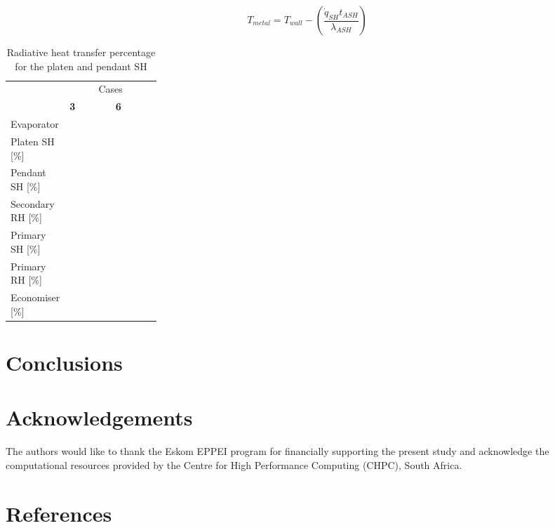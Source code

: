 \documentclass[review]{elsarticle}
\begin{document}
\begin{equation}
T_{metal} = T_{wall} - \left(\frac{\dot{q}_{SH}t_{ASH}}{\lambda_{ASH}}\right)
\end{equation}

\begin{table}[h!]
\centering
\caption{Radiative heat transfer percentage for the platen and pendant SH}
\label{fuel}
{\tabulinesep=1.2mm
\begin{tabularx}{\linewidth}{p{0.25\linewidth} XX}
\hline
&\multicolumn{2}{c}{Cases}\\
 &\textbf{3}&\textbf{6}\\
\hline
Evaporator \\
Platen SH [\%] & \\
Pendant SH [\%] &\\
Secondary RH [\%]\\
Primary SH [\%]\\
Primary RH [\%]\\
Economiser [\%]\\
\hline
\end{tabularx}}
\end{table}

\clearpage
\section{Conclusions}

\section*{Acknowledgements}
The authors would like to thank the Eskom EPPEI program for financially supporting the present study and acknowledge the computational resources provided by the Centre for High Performance Computing (CHPC), South Africa.

\section*{References}


\end{document}
